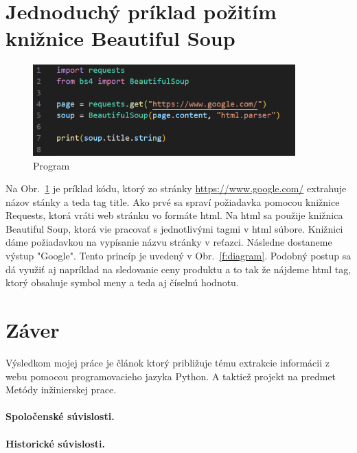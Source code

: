 \documentclass[10pt,twoside,slovak,a4paper]{article}
\begin{document}
\section{Jednoduchý príklad požitím knižnice Beautiful Soup} \label{imp}

\begin{figure}[tbh]
    \centering
    \includegraphics[width= 0.9\textwidth]{code.png}
    \caption{Program}
    \label{f:code}
\end{figure}

Na Obr.~\ref{f:code} je príklad kódu, ktorý zo stránky \url{https://www.google.com/} extrahuje názov stánky a teda tag title. Ako prvé sa spraví požiadavka pomocou knižnice Requests, ktorá vráti web stránku vo formáte html. Na html sa použije knižnica Beautiful Soup, ktorá vie pracovať s jednotlivými tagmi v html súbore. Knižnici dáme požiadavkou na vypísanie názvu stránky v reťazci. Následne dostaneme výstup "Google". Tento princíp je uvedený v Obr.~\ref{f:diagram}. Podobný postup sa dá využiť aj napríklad na sledovanie ceny produktu a to tak že nájdeme html tag, ktorý obsahuje symbol meny a teda aj číselnú hodnotu.



\section{Záver} \label{zaver} %
Výsledkom mojej práce je článok ktorý približuje tému extrakcie informácii z webu pomocou programovacieho jazyka Python. A taktiež projekt na predmet Metódy inžinierskej prace.


\paragraph{Spoločenské súvislosti.}

\paragraph{Historické súvislosti.}
\end{document}
